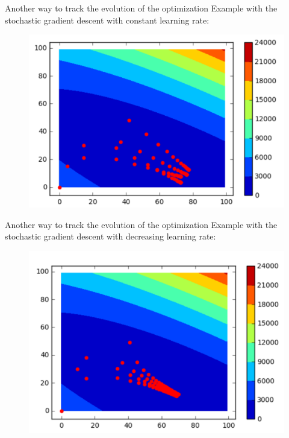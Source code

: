 \documentclass{beamer}
\newcommand{\1}[1]{\mathbbm{1}\left[#1\right]}
\begin{document}
\begin{frame}{Another way to track the evolution of the optimization}
Example with the stochastic gradient descent with constant learning rate:
\begin{figure}
\centering
\includegraphics[width=\linewidth]{images/theta_evolution_sgd_constant_alpha.png}
\end{figure}
\end{frame}

\begin{frame}{Another way to track the evolution of the optimization}
Example with the stochastic gradient descent with decreasing learning rate:
\begin{figure}
\centering
\includegraphics[width=\linewidth]{images/theta_evolution_sgd_decreasing_alpha.png}
\end{figure}
\end{frame}
\end{document}
